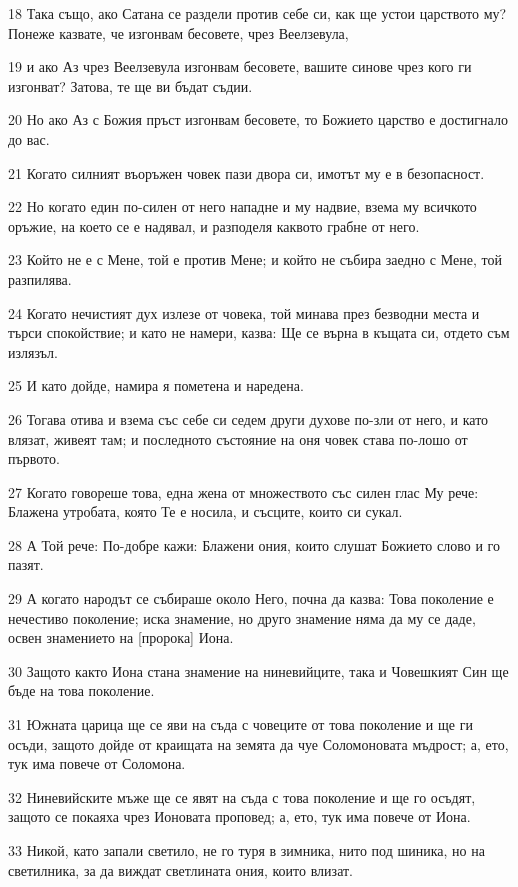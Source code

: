 \par 18 Така също, ако Сатана се раздели против себе си, как ще устои царството му? Понеже казвате, че изгонвам бесовете, чрез Веелзевула,
\par 19 и ако Аз чрез Веелзевула изгонвам бесовете, вашите синове чрез кого ги изгонват? Затова, те ще ви бъдат съдии.
\par 20 Но ако Аз с Божия пръст изгонвам бесовете, то Божието царство е достигнало до вас.
\par 21 Когато силният въоръжен човек пази двора си, имотът му е в безопасност.
\par 22 Но когато един по-силен от него нападне и му надвие, взема му всичкото оръжие, на което се е надявал, и разподеля каквото грабне от него.
\par 23 Който не е с Мене, той е против Мене; и който не събира заедно с Мене, той разпилява.
\par 24 Когато нечистият дух излезе от човека, той минава през безводни места и търси спокойствие; и като не намери, казва: Ще се върна в къщата си, отдето съм излязъл.
\par 25 И като дойде, намира я пометена и наредена.
\par 26 Тогава отива и взема със себе си седем други духове по-зли от него, и като влязат, живеят там; и последното състояние на оня човек става по-лошо от първото.
\par 27 Когато говореше това, една жена от множеството със силен глас Му рече: Блажена утробата, която Те е носила, и съсците, които си сукал.
\par 28 А Той рече: По-добре кажи: Блажени ония, които слушат Божието слово и го пазят.
\par 29 А когато народът се събираше около Него, почна да казва: Това поколение е нечестиво поколение; иска знамение, но друго знамение няма да му се даде, освен знамението на [пророка] Иона.
\par 30 Защото както Иона стана знамение на ниневийците, така и Човешкият Син ще бъде на това поколение.
\par 31 Южната царица ще се яви на съда с човеците от това поколение и ще ги осъди, защото дойде от краищата на земята да чуе Соломоновата мъдрост; а, ето, тук има повече от Соломона.
\par 32 Ниневийските мъже ще се явят на съда с това поколение и ще го осъдят, защото се покаяха чрез Ионовата проповед; а, ето, тук има повече от Иона.
\par 33 Никой, като запали светило, не го туря в зимника, нито под шиника, но на светилника, за да виждат светлината ония, които влизат.
